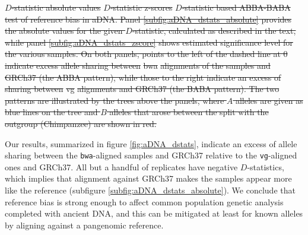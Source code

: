 \documentclass[a4paper,12pt,numbered,oneside]{Classes/PhDThesisPSnPDF}
\providecommand{\DIFdeltex}[1]{{\protect\color{red}\sout{#1}}}                      %
\providecommand{\DIFdelbegin}{} %
\providecommand{\DIFdelend}{} %
\providecommand{\DIFdelFL}[1]{\DIFdel{#1}} %
\providecommand{\DIFdel}[1]{\texorpdfstring{\DIFdeltex{#1}}{}} %
\begin{document}
\DIFdelbegin %
{%
\DIFdelFL{$D$-statistic absolute values}}
{%
\DIFdelFL{$D$-statistic z-scores}}
{%
\DIFdelFL{$D$-statistic based ABBA-BABA test of reference bias in aDNA.
    Panel \ref{subfig:aDNA_dstats_absolute} provides the absolute values for the given $D$-statistic, calculated as described in the text, while panel \ref{subfig:aDNA_dstats_zscore} shows estimated significance level for the various samples.
    On both panels, points to the left of the dashed line at 0 indicate excess allele sharing between }%
\DIFdelFL{bwa}%
\DIFdelFL{alignments of the samples and GRCh37 (the ABBA pattern), while those to the right indicate an excess of sharing between }%
\DIFdelFL{vg}%
\DIFdelFL{alignments and GRCh37 (the BABA pattern).
    The two patterns are illustrated by the trees above the panels, where $A$ alleles are given as blue lines on the tree and $B$ alleles that arose between the split with the outgroup (Chimpanzee) are shown in red.
  }}

\DIFdelend Our results, summarized in figure \ref{fig:aDNA_dstats}, indicate an excess of allele sharing between the {\tt bwa}-aligned samples and GRCh37 relative to the {\tt vg}-aligned ones and GRCh37.
All but a handful of replicates have negative $D$-statistics, which implies that alignment against GRCh37 makes the samples appear more like the reference (subfigure \ref{subfig:aDNA_dstats_absolute}).
We conclude that reference bias is strong enough to affect common population genetic analysis completed with ancient DNA, and this can be mitigated at least for known alleles by aligning against a pangenomic reference.
\end{document}
